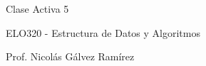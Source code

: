 \documentclass{article}
\begin{document}
\vspace{.5pc}
\centerline{\sc Clase Activa 5}
\centerline{\sc ELO320 - Estructura de Datos y Algoritmos}
\centerline{\sc Prof. Nicolás Gálvez Ramírez}
\vspace{2pc}
\end{document}
